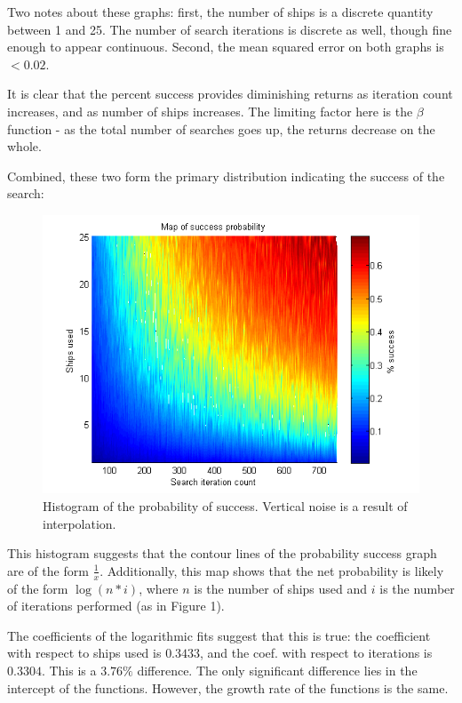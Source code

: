 \documentclass[a4paper]{article}
\begin{document}
Two notes about these graphs: first, the number of ships is a discrete quantity between 1 and 25. The number of search iterations is discrete as well, though fine enough to appear continuous. Second, the mean squared error on both graphs is $< 0.02$.

It is clear that the percent success provides diminishing returns as iteration count increases, and as number of ships increases. The limiting factor here is the $\beta$ function - as the total number of searches goes up, the returns decrease on the whole.

Combined, these two form the primary distribution indicating the success of the search:

\begin{figure}[H]\begin{center}
\includegraphics[scale=0.75]{../Matlab/Images/PctSuccessByItersShips.png}
\caption{Histogram of the probability of success. Vertical noise is a result of interpolation.}
\end{center}\end{figure}

This histogram suggests that the contour lines of the probability success graph are of the form $\frac 1x$. Additionally, this map shows that the net probability is likely of the form $\log(n*i)$, where $n$ is the number of ships used and $i$ is the number of iterations performed (as in Figure 1).

The coefficients of the logarithmic fits suggest that this is true: the coefficient with respect to ships used is $0.3433$, and the coef. with respect to iterations is $0.3304$. This is a $3.76\%$ difference. The only significant difference lies in the intercept of the functions. However, the growth rate of the functions is the same.
\end{document}
